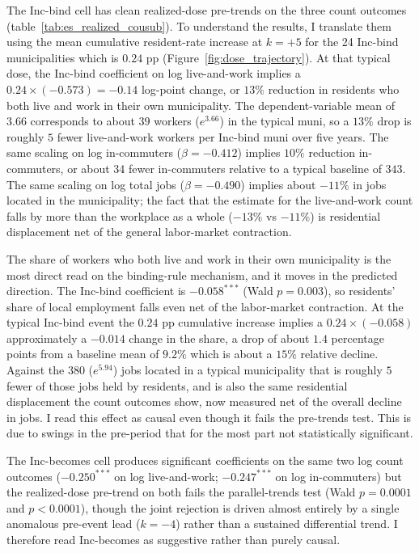 \documentclass[12pt]{article}
\begin{document}
The Inc-bind cell has clean realized-dose pre-trends on the three
count outcomes (table~\ref{tab:es_realized_cousub}). To understand the results, I translate them using the mean cumulative resident-rate increase at
$k=+5$ for the 24 Inc-bind municipalities which is $0.24$ pp
(Figure~\ref{fig:dose_trajectory}). At that typical dose, the
Inc-bind coefficient on log live-and-work implies a
$0.24\times(-0.573)=-0.14$ log-point change, or $13\%$ reduction in
residents who both live and work in their own municipality. The
dependent-variable mean of $3.66$ corresponds to about $39$ workers ($e^{3.66}$) in the typical muni, so a $13\%$ drop is
roughly $5$ fewer live-and-work workers per Inc-bind muni over
five years. The same scaling on log in-commuters
($\beta=-0.412$) implies $10\%$ reduction in-commuters, or about 34 fewer
in-commuters relative to a typical baseline of
$343$. The same scaling on log total jobs ($\beta=-0.490$) implies
about $-11\%$ in jobs located in the municipality; the fact that the estimate for the
live-and-work count falls by more than the workplace as a whole
($-13\%$ vs $-11\%$) is residential displacement net of the general
labor-market contraction.

The share of workers who both live and work in their own
municipality is the most direct read on the binding-rule mechanism,
and it moves in the predicted direction. The Inc-bind coefficient is
$-0.058^{***}$ (Wald $p=0.003$), so residents' share of local
employment falls even net of the labor-market contraction. At the
typical Inc-bind event the $0.24$ pp cumulative increase implies a
$0.24\times(-0.058)$ approximately a $-0.014$ change in the share, a drop of
about $1.4$ percentage points from a baseline mean of $9.2\%$ which is about a
$15\%$ relative decline. Against the $380$ ($e^{5.94}$) jobs
located in a typical municipality that is roughly $5$ fewer of those
jobs held by residents, and is also the same residential displacement the count
outcomes show, now measured net of the overall decline in jobs. I read this effect as causal even though it fails the pre-trends test. This is due to swings in the pre-period that for the most part not statistically significant. 

The Inc-becomes cell produces significant coefficients on the
same two log count outcomes ($-0.250^{***}$ on log live-and-work;
$-0.247^{***}$ on log in-commuters) but the realized-dose
pre-trend on both fails the parallel-trends test (Wald $p=0.0001$
and $p<0.0001$), though the joint rejection is driven almost
entirely by a single anomalous pre-event lead ($k=-4$) rather than
a sustained differential trend. I therefore read
Inc-becomes as suggestive rather than purely causal.
\end{document}
